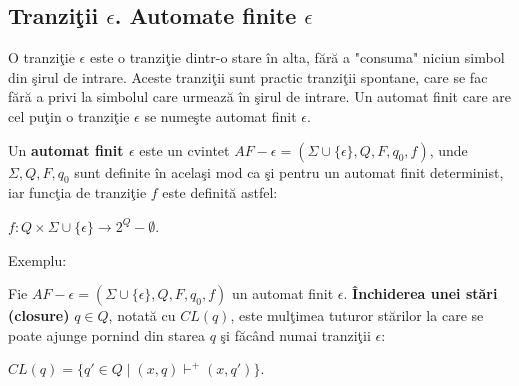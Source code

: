 \subsection{Tranziţii $\epsilon$. Automate finite $\epsilon$}

O tranziţie $\epsilon$ este o tranziţie dintr-o stare în alta, fără a "consuma" niciun simbol din şirul de intrare. Aceste tranziţii sunt practic tranziţii spontane, care se fac fără a privi la simbolul care urmează în şirul de intrare. Un automat finit care are cel puţin o tranziţie $\epsilon$ se numeşte automat finit $\epsilon$.

\begin{definitie}
Un \textbf{automat finit $\epsilon$} este un cvintet $AF-\epsilon=(\Sigma \cup \{ \epsilon \}, Q, F, q_{0}, f)$, unde $\Sigma, Q, F, q_{0}$ sunt definite în acelaşi mod ca şi pentru un automat finit determinist, iar funcţia de tranziţie $f$ este definită astfel:

$f:Q \times \Sigma \cup \{ \epsilon \} \rightarrow 2^{Q} - \emptyset$.
\end{definitie}

Exemplu:

\begin{figure}[H]
\centering
{}
\end{figure}

\begin{definitie}
Fie $AF-\epsilon=(\Sigma \cup \{ \epsilon \}, Q, F, q_{0}, f)$ un automat finit $ \epsilon $. \textbf{Închiderea unei stări (closure)} $q \in Q$, notată cu $CL(q)$, este mulţimea tuturor stărilor la care se poate ajunge pornind din starea $ q $ şi făcând numai tranziţii $\epsilon$:

$CL(q) = \{ q' \in Q \; | \; (x, q) \vdash^+ (x, q') \}$.
\end{definitie}


